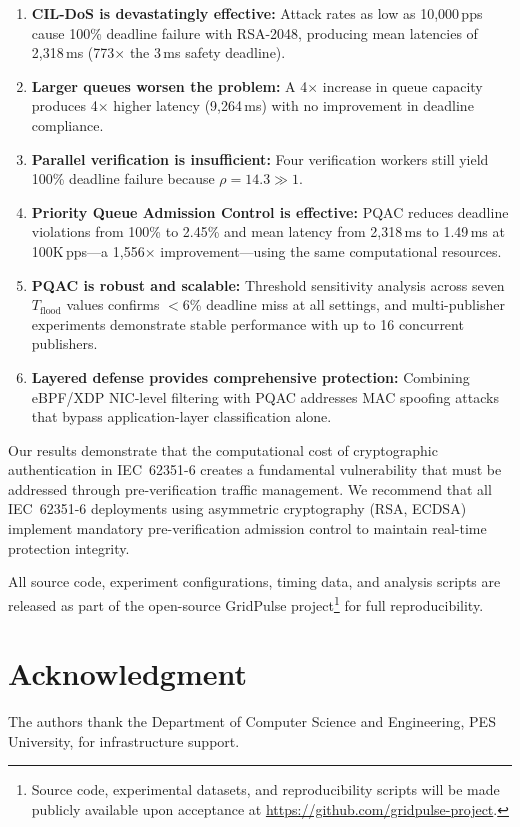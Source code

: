 \documentclass{ieeeaccess}
\begin{document}
\begin{enumerate}[leftmargin=*]
    \item \textbf{CIL-DoS is devastatingly effective:} Attack rates as low as 10,000\,pps cause 100\% deadline failure with RSA-2048, producing mean latencies of 2,318\,ms (773$\times$ the 3\,ms safety deadline).
    \item \textbf{Larger queues worsen the problem:} A 4$\times$ increase in queue capacity produces 4$\times$ higher latency (9,264\,ms) with no improvement in deadline compliance.
    \item \textbf{Parallel verification is insufficient:} Four verification workers still yield 100\% deadline failure because $\rho = 14.3 \gg 1$.
    \item \textbf{Priority Queue Admission Control is effective:} PQAC reduces deadline violations from 100\% to 2.45\% and mean latency from 2,318\,ms to 1.49\,ms at 100K\,pps---a 1,556$\times$ improvement---using the same computational resources.
    \item \textbf{PQAC is robust and scalable:} Threshold sensitivity analysis across seven $T_{\text{flood}}$ values confirms $<$6\% deadline miss at all settings, and multi-publisher experiments demonstrate stable performance with up to 16 concurrent publishers.
    \item \textbf{Layered defense provides comprehensive protection:} Combining eBPF/XDP NIC-level filtering with PQAC addresses MAC spoofing attacks that bypass application-layer classification alone.
\end{enumerate}

Our results demonstrate that the computational cost of cryptographic authentication in IEC~62351-6 creates a fundamental vulnerability that must be addressed through pre-verification traffic management. We recommend that all IEC~62351-6 deployments using asymmetric cryptography (RSA, ECDSA) implement mandatory pre-verification admission control to maintain real-time protection integrity.

All source code, experiment configurations, timing data, and analysis scripts are released as part of the open-source GridPulse project\footnote{Source code, experimental datasets, and reproducibility scripts will be made publicly available upon acceptance at \url{https://github.com/gridpulse-project}.} for full reproducibility.

\section*{Acknowledgment}
The authors thank the Department of Computer Science and Engineering, PES University, for infrastructure support.
\end{document}
